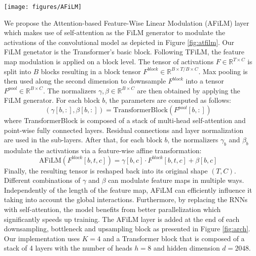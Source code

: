 \documentclass{article}
\begin{document}
\begin{figure*}[htb]
    \centering
    \texttt{[image: figures/AFiLM]}
    \caption{The AFiLM layer uses a Transformer block as a FiLM generator. Element-wise multiplication and addition are performed to modulate the feature maps. This illustration uses $T=8, C=4, B=2$.}
    \label{fig:atfilm}
\end{figure*}

We propose the Attention-based Feature-Wise Linear Modulation (AFiLM) layer which makes use of self-attention as the FiLM generator to modulate the activations of the convolutional model as depicted in Figure \ref{fig:atfilm}. Our FiLM genetator is the Transformer's \cite{vaswani2017attention} basic block. Following TFiLM, the feature map modulation is applied on a block level. The tensor of activations $F \in \mathbb{R}^{T \times C}$ is split into $B$ blocks resulting in a block tensor $F^{block} \in \mathbb{R}^{B \times T/B \times C}$. Max pooling is then used along the second dimension to downsample $F^{block}$ into a tensor $F^{pool} \in \mathbb{R}^{B \times C}$. The normalizers $\gamma, \beta \in \mathbb{R}^{B \times C}$ are then obtained by applying the FiLM generator. For each block $b$, the parameters are computed as follows:
\begin{equation}
    (\gamma[b,:], \beta[b,:]) = \textrm{TransformerBlock}(F^{pool}[b,:])
\end{equation}
where TransformerBlock is composed of a stack of multi-head self-attention and point-wise fully
connected layers. Residual connections and layer normalization \cite{ba2016layer} are used in the sub-layers. After that, for each block $b$, the normalizers $\gamma_b$ and $\beta_b$ modulate the activations via a feature-wise affine transformation:
\begin{equation}
    \textrm{AFiLM}(F^{block}[b,t,c]) = \gamma[b,c] \cdot F^{block}[b,t,c]  + \beta[b,c]
\end{equation}
Finally, the resulting tensor is reshaped back into its original shape $(T,C)$. Different combinations of $\gamma$ and $\beta$ can modulate feature maps in multiple ways. Independently of the length of the feature map, AFiLM can efficiently influence it taking into account the global interactions. Furthermore, by replacing the RNNs with self-attention, the model benefits from better parallelization which significantly speeds up training.  The AFiLM layer is added at the end of each downsampling, bottleneck and upsampling block as presented in Figure \ref{fig:arch}. Our implementation uses $K=4$ and a Transformer block that is composed of a stack of 4 layers with the number of heads $h=8$ and hidden dimension $d=2048$. 
\end{document}
